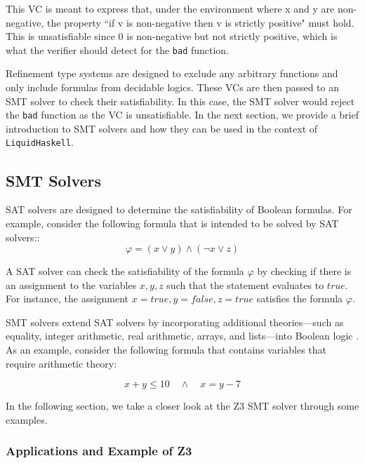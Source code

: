 \documentclass[]{rptuseminar}
\begin{document}
This VC is meant to express that, under the environment where x and y are non-negative, 
the property “if v is non-negative then v is strictly positive" must hold. 
This is unsatisfiable since 0 is non-negative but not strictly positive, which is what the verifier 
should detect for the \texttt{bad} function.

Refinement type systems are designed to exclude any arbitrary functions and only include formulas
from decidable logics\cite{vazou_refinement_2014}. These VCs are then passed to an SMT solver to check their satisfiability.
In this case, the SMT solver would reject the \texttt{bad} function as the VC is unsatisfiable.
In the next section, we provide a brief introduction to SMT solvers and how they can be used in the context of \texttt{LiquidHaskell}.

\subsection{SMT Solvers}
SAT solvers are designed to determine the satisfiability of Boolean formulas\cite{clarke_satisfiability_2018}. 
For example, consider the following formula that is intended to be solved by SAT solvers::
\begin{equation}
  \varphi = (x \lor y) \land (\lnot x \lor z)
\end{equation}

A SAT solver can check the satisfiability of the formula \(\varphi\) by checking if there is an assignment to the variables 
\(x, y, z\) such that the statement evaluates to \(true\).
For instance, the assignment \(x = true, y = false, z = true\) satisfies the formula \(\varphi\).

SMT solvers extend SAT solvers by incorporating additional theories—such as equality, integer arithmetic, real arithmetic, 
arrays, and lists—into Boolean logic \cite{clarke_satisfiability_2018}.
As an example, consider the following formula that contains variables that require arithmetic theory:

\begin{equation}
  x + y \leq 10 \quad \land \quad x = y - 7
\end{equation}

In the following section, we take a closer look at the Z3 SMT solver through some examples.
\subsubsection{Applications and Example of Z3}
\end{document}
